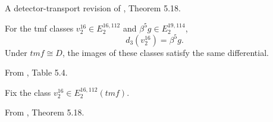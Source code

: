 \begin{theorem}
\label{sem:Literature:tmf-d-three}
A detector-transport revision of \cite{BR21}, Theorem 5.18.\par

For the tmf classes $v_2^{16}\in E_2^{16,112}$ and $\beta^5g\in E_2^{19,114}$,
\[d_3(v_2^{16})=\beta^5g.\]
Under $\mathit{tmf}\cong D$, the images of these classes satisfy the same differential.

From \cite{BR21}, Table 5.4.\par

Fix the class $v_2^{16}\in E_2^{16,112}(\mathit{tmf})$.

From \cite{BR21}, Theorem 5.18.\par


\end{theorem}
